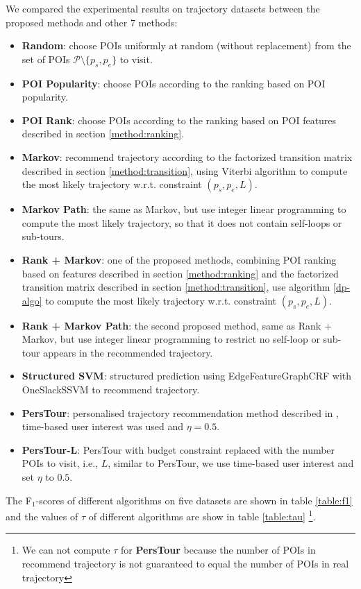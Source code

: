 We compared the experimental results on trajectory datasets between the proposed methods and other 7 methods:
\begin{itemize}
\item \textbf{Random}: choose POIs uniformly at random (without replacement) 
      from the set of POIs $\mathcal{P} \setminus \{p_s, p_e \}$ to visit.
\item \textbf{POI Popularity}: choose POIs according to the ranking based on POI popularity.
\item \textbf{POI Rank}: choose POIs according to the ranking based on POI features described in section \ref{method:ranking}.
\item \textbf{Markov}: recommend trajectory according to the factorized transition matrix described in section \ref{method:transition},
      using Viterbi algorithm to compute the most likely trajectory w.r.t. constraint $(p_s, p_e, L)$.
\item \textbf{Markov Path}: the same as Markov, but use integer linear programming to compute the most likely trajectory,
      so that it does not contain self-loops or sub-tours.
\item \textbf{Rank + Markov}: one of the proposed methods, combining POI ranking based on features 
      described in section \ref{method:ranking} and the factorized transition matrix described in section \ref{method:transition},
      use algorithm \ref{dp-algo} to compute the most likely trajectory w.r.t. constraint $(p_s, p_e, L)$.
\item \textbf{Rank + Markov Path}: the second proposed method, same as Rank + Markov,
      but use integer linear programming to restrict no self-loop or sub-tour appears in the recommended trajectory.
\item \textbf{Structured SVM}: structured prediction using EdgeFeatureGraphCRF with OneSlackSSVM to recommend trajectory.
\item \textbf{PersTour}\cite{ijcai15}: personalised trajectory recommendation method described in \cite{ijcai15}, 
      time-based user interest was used and $\eta = 0.5$.
\item \textbf{PersTour-L}: PersTour\cite{ijcai15} with budget constraint replaced with the number POIs to visit, i.e., $L$,
      similar to PersTour, we use time-based user interest and set $\eta$ to $0.5$.
\end{itemize}

The F$_1$-scores of different algorithms on five datasets are shown in table \ref{table:f1}
and the values of $\tau$ of different algorithms are show in table \ref{table:tau}
\footnote{We can not compute $\tau$ for \textbf{PersTour} because the number of POIs in recommend trajectory is not guaranteed to equal the number of POIs in real trajectory}.

